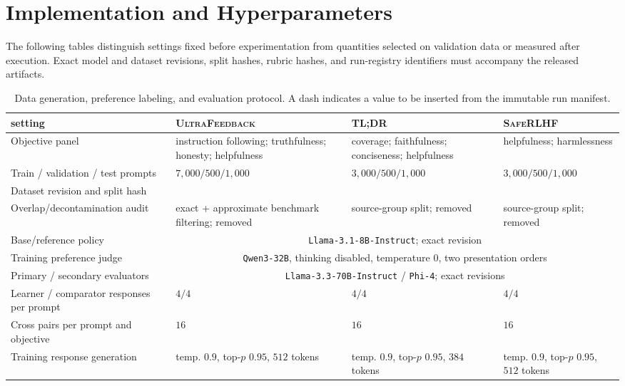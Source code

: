 \documentclass{article}
\theoremstyle{remark}
\theoremstyle{plain}
\newcommand{\pending}{\textemdash}
\begin{document}
\section{Implementation and Hyperparameters}
\label{app:hyperparameters}
The following tables distinguish settings fixed before experimentation from quantities selected on validation data or measured after execution. Exact model and dataset revisions, split hashes, rubric hashes, and run-registry identifiers must accompany the released artifacts.

\begin{table}[t]
\centering\scriptsize
\setlength{\tabcolsep}{2.2pt}
\caption{Data generation, preference labeling, and evaluation protocol. A dash indicates a value to be inserted from the immutable run manifest.}
\label{tab:data-sampling-hparams}
\begin{tabular}{@{}p{}p{}p{}p{}@{}}
\toprule
setting & \textsc{UltraFeedback} & \textsc{TL;DR} & \textsc{SafeRLHF}\\
\midrule
Objective panel & instruction following; truthfulness; honesty; helpfulness & coverage; faithfulness; conciseness; helpfulness & helpfulness; harmlessness\\
Train / validation / test prompts & $7{,}000/500/1{,}000$ & $3{,}000/500/1{,}000$ & $3{,}000/500/1{,}000$\\
Dataset revision and split hash & \pending & \pending & \pending\\
Overlap/decontamination audit & exact + approximate benchmark filtering; \pending removed & source-group split; \pending removed & source-group split; \pending removed\\
Base/reference policy & \multicolumn{3}{c}{\texttt{Llama-3.1-8B-Instruct}; exact revision \pending}\\
Training preference judge & \multicolumn{3}{c}{\texttt{Qwen3-32B}, thinking disabled, temperature $0$, two presentation orders}\\
Primary / secondary evaluators & \multicolumn{3}{c}{\texttt{Llama-3.3-70B-Instruct} / \texttt{Phi-4}; exact revisions \pending}\\
Learner / comparator responses per prompt & $4/4$ & $4/4$ & $4/4$\\
Cross pairs per prompt and objective & $16$ & $16$ & $16$\\
Training response generation & temp. $0.9$, top-$p$ $0.95$, $512$ tokens & temp. $0.9$, top-$p$ $0.95$, $384$ tokens & temp. $0.9$, top-$p$ $0.95$, $512$ tokens\\

\end{tabular}
\end{table}
\end{document}
